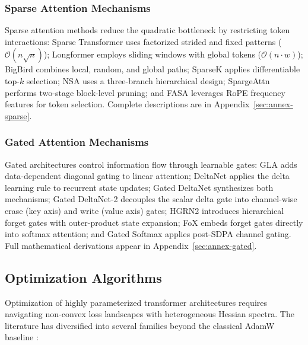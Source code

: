 \documentclass[11pt,a4paper]{article}
\begin{document}
\subsubsection{Sparse Attention Mechanisms}
Sparse attention methods reduce the quadratic bottleneck by restricting token interactions: Sparse Transformer \citep{child_sparse_transformer_2019} uses factorized strided and fixed patterns ($\mathcal{O}(n\sqrt{n})$); Longformer \citep{beltagy_longformer_2020} employs sliding windows with global tokens ($\mathcal{O}(n \cdot w)$); BigBird \citep{zaheer_bigbird_2020} combines local, random, and global paths; SparseK \citep{lou_sparsek_2024} applies differentiable top-$k$ selection; NSA \citep{yuan_nsa_2025} uses a three-branch hierarchical design; SpargeAttn \citep{zhang_spargeattn_2025} performs two-stage block-level pruning; and FASA \citep{wang_fasa_2026} leverages RoPE frequency features for token selection. Complete descriptions are in Appendix~\ref{sec:annex-sparse}.

\subsubsection{Gated Attention Mechanisms}
Gated architectures control information flow through learnable gates: GLA \citep{yang_gla_2023} adds data-dependent diagonal gating to linear attention; DeltaNet \citep{yang_deltanet_2024} applies the delta learning rule to recurrent state updates; Gated DeltaNet \citep{yang_gated_deltanet_2024} synthesizes both mechanisms; Gated DeltaNet-2 \citep{hatamizadeh_gated_deltanet2_2026} decouples the scalar delta gate into channel-wise erase (key axis) and write (value axis) gates; HGRN2 \citep{qin_hgrn2_2024} introduces hierarchical forget gates with outer-product state expansion; FoX \citep{lin_forgetting_transformer_2025} embeds forget gates directly into softmax attention; and Gated Softmax \citep{qiu_gated_attention_2025} applies post-SDPA channel gating. Full mathematical derivations appear in Appendix~\ref{sec:annex-gated}.

\subsection{Optimization Algorithms}

Optimization of highly parameterized transformer architectures requires navigating non-convex loss landscapes with heterogeneous Hessian spectra. The literature has diversified into several families beyond the classical AdamW baseline \citep{loshchilov_decoupled_2017}:
\end{document}
